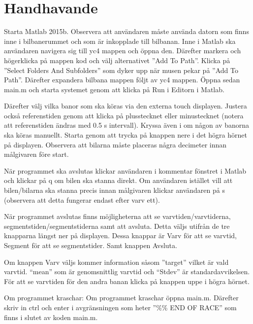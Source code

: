 \section{Handhavande}
Starta Matlab 2015b. Observera att användaren måste använda datorn som finns
inne i bilbanerummet och som är inkopplade till bilbanan. Inne i Matlab ska användaren navigera sig till yc4 mappen och öppna den. Därefter markera och högerklicka på mappen kod och välj alternativet ''Add To Path''. Klicka på ''Select Folders And Subfolders'' som dyker upp när musen pekar på ''Add To Path''. Därefter expandera bilbana mappen följt av yc4 mappen. Öppna sedan main.m och starta systemet genom att klicka på Run i Editorn i Matlab.

Därefter välj vilka banor som ska köras via den externa touch displayen. Justera också referenstiden genom att klicka på plusstecknet eller minustecknet (notera att referenstiden ändras med 0.5 s intervall). Kryssa även i om någon av banorna ska köras manuellt. Starta genom att trycka på knappen nere i det högra hörnet på displayen. Observera att bilarna måste placeras några decimeter innan målgivaren före start.

När programmet ska avslutas klickar användaren i kommentar fönstret i Matlab och
klickar på q om bilen ska stanna direkt. Om användaren istället vill att
bilen/bilarna ska stanna precis innan målgivaren klickar användaren på s
(observera att detta fungerar endast efter varv ett).

När programmet avslutas finns möjligheterna att se varvtiden/varvtiderna,
segmentstiden/segmentstiderna samt att avsluta. Detta väljs utifrån de tre
knapparna längst ner på displayen. Dessa knappar är Varv för att se varvtid,
Segment för att se segmentstider. Samt knappen Avsluta.

Om knappen Varv väljs kommer information såsom ''target'' vilket är vald varvtid.
“mean” som är genomsnittlig varvtid och “Stdev” är standardavvikelsen. För att
se varvtiden för den andra banan klicka på knappen uppe i högra hörnet.

Om programmet kraschar: Om programmet kraschar öppna main.m. Därefter skriv in
ctrl och enter i avgränsningen som heter ''\%\% END OF RACE'' som finns i slutet av
koden main.m.
